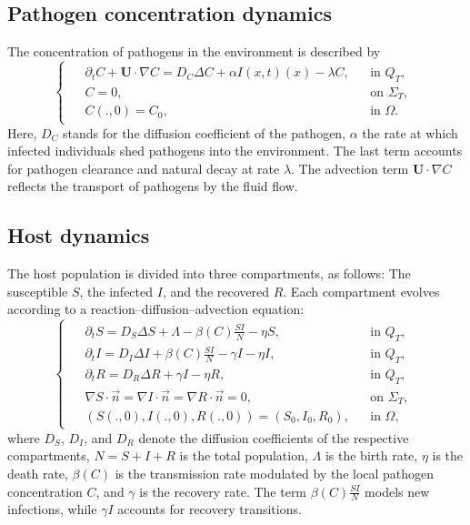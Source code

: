 \documentclass[10pt,number,preprint,times]{elsarticle}
\numberwithin{equation}{section} %
\begin{document}
	\subsection{{Pathogen concentration dynamics}}
	\noindent
	The concentration of pathogens in the environment is described by
	\begin{equation}
		\begin{cases}
			\begin{split}
				&\partial_t C + \boldsymbol{U}\cdot\nabla C = D_C\Delta C + \alpha I(x,t)(x) - \lambda C, &&\text{in } Q_T,\\
				&C=0, && \text{on } \Sigma_T,\\
				&C(.,0)=C_0, && \text{in } \Omega.
			\end{split}
		\end{cases}
	\end{equation}
	Here, $D_C$ stands for the diffusion coefficient of the pathogen, $\alpha$ the rate at which infected individuals shed pathogens into the environment. The last term accounts for pathogen clearance and natural decay at rate $\lambda$. The advection term $\boldsymbol{U}\cdot\nabla C$ reflects the transport of pathogens by the fluid flow.
	
	\subsection{{Host dynamics}}
	\noindent
	The host population is divided into three compartments, as follows:  The susceptible $S$, the infected $I$, and the recovered $R$. Each compartment evolves according to a reaction–diffusion–advection equation:
	\begin{equation}
		\begin{cases}
			\begin{split}
				&\partial_t S= D_S\Delta S +\Lambda- \beta(C)\frac{SI}{N}-\eta S, &&\text{in } Q_T,\\
				&\partial_t I= D_I\Delta I + \beta(C)\frac{SI}{N} - \gamma I-\eta I, &&\text{in } Q_T,\\
				&\partial_t R= D_R\Delta R + \gamma I-\eta R, &&\text{in } Q_T,\\
				&\nabla S \cdot \overrightarrow{n}=\nabla I \cdot \overrightarrow{n}=\nabla R \cdot \overrightarrow{n}=0, &&\text{on } \Sigma_T,\\
				&(S(.,0),I(.,0),R(.,0))=(S_0,I_0,R_0), &&\text{in } \Omega,
			\end{split}
		\end{cases}
	\end{equation}
	where $D_S$, $D_I$, and $D_R$ denote the diffusion coefficients of the respective compartments, $N=S+I+R$ is the total population, $\Lambda$ is the birth rate, $\eta$ is the death rate, $\beta(C)$ is the transmission rate modulated by the local pathogen concentration $C$, and $\gamma$ is the recovery rate. The term $\beta(C)\frac{SI}{N}$ models new infections, while $\gamma I$ accounts for recovery transitions.
	
\end{document}
